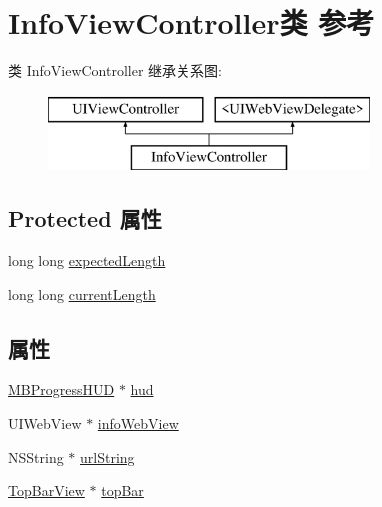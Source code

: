 \hypertarget{interface_info_view_controller}{\section{Info\-View\-Controller类 参考}
\label{interface_info_view_controller}
}
类 Info\-View\-Controller 继承关系图\-:\begin{figure}[H]
\begin{center}
\leavevmode
\includegraphics[height=2.000000cm]{interface_info_view_controller}
\end{center}
\end{figure}
\subsection*{Protected 属性}
\begin{DoxyCompactItemize}
\item 
long long \hyperlink{interface_info_view_controller_a46035a05e80e8252c07e1f2f88e034da}{expected\-Length}
\item 
long long \hyperlink{interface_info_view_controller_a5cda7e7567608b413aa8f2a82b05cf50}{current\-Length}
\end{DoxyCompactItemize}
\subsection*{属性}
\begin{DoxyCompactItemize}
\item 
\hyperlink{interface_m_b_progress_h_u_d}{M\-B\-Progress\-H\-U\-D} $\ast$ \hyperlink{interface_info_view_controller_a1a2a712f0824f338296c51f09088d50a}{hud}
\item 
U\-I\-Web\-View $\ast$ \hyperlink{interface_info_view_controller_a34d0ec0083fd66336b41a8393e51f91d}{info\-Web\-View}
\item 
N\-S\-String $\ast$ \hyperlink{interface_info_view_controller_affc65776e53e867683a286f3c86384e9}{url\-String}
\item 
\hyperlink{interface_top_bar_view}{Top\-Bar\-View} $\ast$ \hyperlink{interface_info_view_controller_a047156b12d76ef4fbf44a13eb499a887}{top\-Bar}
\end{DoxyCompactItemize}


